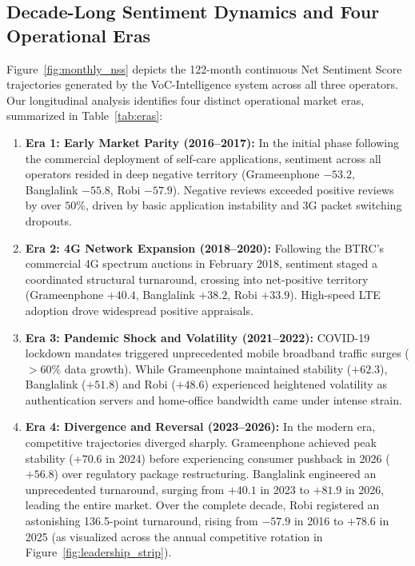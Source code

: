 \documentclass[5p,twocolumn,authoryear]{elsarticle}
\begin{document}
\subsection{Decade-Long Sentiment Dynamics and Four Operational Eras}
Figure~\ref{fig:monthly_nss} depicts the 122-month continuous Net Sentiment Score trajectories generated by the VoC-Intelligence system across all three operators. Our longitudinal analysis identifies four distinct operational market eras, summarized in Table~\ref{tab:eras}:
\begin{enumerate}
    \item \textbf{Era 1: Early Market Parity (2016--2017):} In the initial phase following the commercial deployment of self-care applications, sentiment across all operators resided in deep negative territory (Grameenphone $-53.2$, Banglalink $-55.8$, Robi $-57.9$). Negative reviews exceeded positive reviews by over $50\%$, driven by basic application instability and 3G packet switching dropouts.
    \item \textbf{Era 2: 4G Network Expansion (2018--2020):} Following the BTRC's commercial 4G spectrum auctions in February 2018, sentiment staged a coordinated structural turnaround, crossing into net-positive territory (Grameenphone $+40.4$, Banglalink $+38.2$, Robi $+33.9$). High-speed LTE adoption drove widespread positive appraisals.
    \item \textbf{Era 3: Pandemic Shock and Volatility (2021--2022):} COVID-19 lockdown mandates triggered unprecedented mobile broadband traffic surges ($>60\%$ data growth). While Grameenphone maintained stability ($+62.3$), Banglalink ($+51.8$) and Robi ($+48.6$) experienced heightened volatility as authentication servers and home-office bandwidth came under intense strain.
    \item \textbf{Era 4: Divergence and Reversal (2023--2026):} In the modern era, competitive trajectories diverged sharply. Grameenphone achieved peak stability ($+70.6$ in 2024) before experiencing consumer pushback in 2026 ($+56.8$) over regulatory package restructuring. Banglalink engineered an unprecedented turnaround, surging from $+40.1$ in 2023 to $+81.9$ in 2026, leading the entire market. Over the complete decade, Robi registered an astonishing 136.5-point turnaround, rising from $-57.9$ in 2016 to $+78.6$ in 2025 (as visualized across the annual competitive rotation in Figure~\ref{fig:leadership_strip}).
\end{enumerate}
\end{document}
